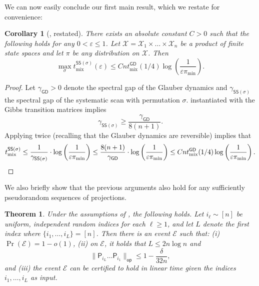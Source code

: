 \documentclass[11pt]{article}
\newtheorem{theorem}{Theorem}[section]
\newtheorem{corollary}{Corollary}[section]
\begin{document}
We can now easily conclude our first main result, which we restate for convenience:
\begin{corollary}[, restated]
\label{cor:mixing}
    There exists an absolute constant $C>0$ such that the following holds for any $0<\varepsilon\leq 1$. Let $\mathcal{X}=\mathcal{X}_1\times \ldots\times \mathcal{X}_n$ be a product of finite state spaces and let $\pi$ be any distribution on $\mathcal{X}$. Then
    \begin{equation*}
        \max_{\sigma}t^{\mathsf{SS}(\sigma)}_{\mathrm{mix}}(\varepsilon)\leq Cnt^{\mathsf{GD}}_{\mathrm{mix}}(1/4)\log\left(\frac{1}{\varepsilon\pi_{\mathrm{min}}}\right).
    \end{equation*}
\end{corollary}
\begin{proof}
Let $\gamma_{\mathsf{GD}}>0$ denote the spectral gap of the Glauber dynamics and $\gamma_{\mathsf{SS}(\sigma)}$ the spectral gap of the systematic scan with permutation $\sigma$.  instantiated with the Gibbs transition matrices implies 
\begin{equation*}
    \gamma_{\mathsf{SS}(\sigma)}\geq \frac{\gamma_{\mathsf{GD}}}{8(n+1)}.
\end{equation*}
Applying  twice (recalling that the Glauber dynamics are reversible) implies that
\begin{equation*}
    t^{\mathsf{SS}(\sigma)}_{\mathrm{mix}}\leq \frac{1}{\gamma_{\mathsf{SS}(\sigma)}}\cdot \log\left(\frac{1}{\varepsilon\pi_{\mathrm{min}}}\right)\leq\frac{8(n+1)}{\gamma_{\mathsf{GD}}}\cdot \log\left(\frac{1}{\varepsilon\pi_{\mathrm{min}}}\right)\leq Cnt^{\mathsf{GD}}_{\mathrm{mix}}(1/4)\log\left(\frac{1}{\varepsilon\pi_{\mathrm{min}}}\right).\qedhere
\end{equation*}
\end{proof}

We also briefly show that the previous arguments also hold for any sufficiently pseudorandom sequences of projections.
\begin{theorem}
\label{thm:pseudo}
    Under the assumptions of , the following holds. Let $i_{\ell}\sim [n]$ be uniform, independent random indices for each $\ell\geq 1$, and let $L$ denote the first index where $\{i_1,\ldots,i_L\}=[n]$. Then there is an event $\mathcal{E}$ such that: (i) $\Pr(\mathcal{E})=1-o(1)$, (ii) on $\mathcal{E}$, it holds that $L\leq 2n\log n$ and 
    \begin{equation*}
        \|\mathsf{P}_{i_L}\ldots \mathsf{P}_{i_1}\|_{\mathsf{op}}\leq 1-\frac{\delta}{32n},
    \end{equation*}
    and (iii) the event $\mathcal{E}$ can be certified to hold in linear time given the indices $i_1,\ldots,i_L$ as input.
\end{theorem}
\end{document}
